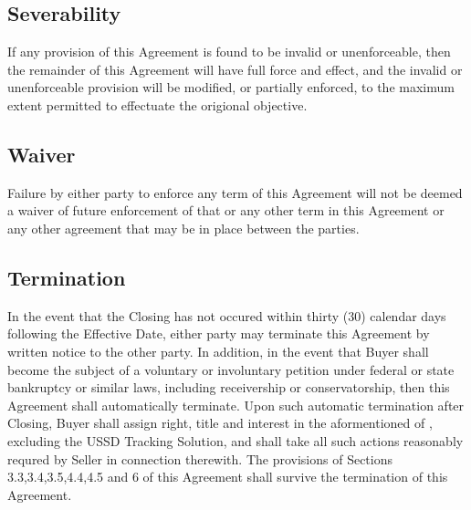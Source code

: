 \documentclass[letterpaper,10pt,english]{sphinxmanual}
\begin{document}
\subsection{Severability}
\label{\detokenize{7-miscellaneous:severability}}
If any provision of this Agreement is found to be invalid or unenforceable, then the remainder of this Agreement will have full force and effect, and the invalid or unenforceable provision will be modified, or partially enforced, to the maximum extent permitted to effectuate the origional objective.


\subsection{Waiver}
\label{\detokenize{7-miscellaneous:waiver}}
Failure by either party to enforce any term of this Agreement will not be deemed a waiver of future enforcement of that or any other term in this Agreement or any other agreement that may be in place between the parties.


\subsection{Termination}
\label{\detokenize{7-miscellaneous:termination}}
In the event that the Closing has not occured within thirty (30) calendar days following the Effective Date, either party may terminate this Agreement by written notice to the other party. In addition, in the event that Buyer shall become the subject of a voluntary or involuntary petition under federal or state bankruptcy or similar laws, including receivership or conservatorship, then this Agreement shall automatically terminate. Upon such automatic termination after Closing, Buyer shall assign right, title and interest in the aformentioned of , excluding the USSD Tracking Solution, and shall take all such actions reasonably requred by Seller in connection therewith. The provisions of Sections 3.3,3.4,3.5,4.4,4.5 and 6 of this Agreement shall survive the termination of this Agreement.
\end{document}
